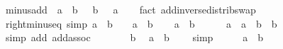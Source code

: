 \begin{isabellebody}
\endisatagproof
{\isafoldproof}%
%
\isadelimproof
\isanewline
%
\endisadelimproof
\isanewline
{}\isamarkupfalse%
\ minus{\isacharunderscore}{\kern0pt}add{\isacharcolon}{\kern0pt}\ {\isachardoublequoteopen}{\isacharminus}{\kern0pt}\ {\isacharparenleft}{\kern0pt}a\ {\isacharplus}{\kern0pt}\ b{\isacharparenright}{\kern0pt}\ {\isacharequal}{\kern0pt}\ {\isacharminus}{\kern0pt}\ b\ {\isacharplus}{\kern0pt}\ {\isacharminus}{\kern0pt}\ a{\isachardoublequoteclose}\isanewline
%
\isadelimproof
\ \ %
\endisadelimproof
%
\isatagproof
{}\isamarkupfalse%
\ {\isacharparenleft}{\kern0pt}fact\ add{\isachardot}{\kern0pt}inverse{\isacharunderscore}{\kern0pt}distrib{\isacharunderscore}{\kern0pt}swap{\isacharparenright}{\kern0pt}%
\endisatagproof
{\isafoldproof}%
%
\isadelimproof
\isanewline
%
\endisadelimproof
\isanewline
{}\isamarkupfalse%
\ right{\isacharunderscore}{\kern0pt}minus{\isacharunderscore}{\kern0pt}eq\ {\isacharbrackleft}{\kern0pt}simp{\isacharbrackright}{\kern0pt}{\isacharcolon}{\kern0pt}\ {\isachardoublequoteopen}a\ {\isacharminus}{\kern0pt}\ b\ {\isacharequal}{\kern0pt}\ {}\ {\isasymlongleftrightarrow}\ a\ {\isacharequal}{\kern0pt}\ b{\isachardoublequoteclose}\isanewline
%
\isadelimproof
%
\endisadelimproof
%
\isatagproof
{}\isamarkupfalse%
\isanewline
\ \ \isamarkupfalse%
\ {\isachardoublequoteopen}a\ {\isacharminus}{\kern0pt}\ b\ {\isacharequal}{\kern0pt}\ {}{\isachardoublequoteclose}\isanewline
\ \ \isamarkupfalse%
\ {\isachardoublequoteopen}a\ {\isacharequal}{\kern0pt}\ {\isacharparenleft}{\kern0pt}a\ {\isacharminus}{\kern0pt}\ b{\isacharparenright}{\kern0pt}\ {\isacharplus}{\kern0pt}\ b{\isachardoublequoteclose}\ \isamarkupfalse%
\ {\isacharparenleft}{\kern0pt}simp\ add{\isacharcolon}{\kern0pt}\ add{\isachardot}{\kern0pt}assoc{\isacharparenright}{\kern0pt}\isanewline
\ \ \isamarkupfalse%
\ \isamarkupfalse%
\ {\isachardoublequoteopen}{\isasymdots}\ {\isacharequal}{\kern0pt}\ b{\isachardoublequoteclose}\ \isamarkupfalse%
\ {\isacartoucheopen}a\ {\isacharminus}{\kern0pt}\ b\ {\isacharequal}{\kern0pt}\ {}{\isacartoucheclose}\ \isamarkupfalse%
\ simp\isanewline
\ \ \isamarkupfalse%
\ \isamarkupfalse%
\ {\isachardoublequoteopen}a\ {\isacharequal}{\kern0pt}\ b{\isachardoublequoteclose}\ \isacommand{{\isachardot}{\kern0pt}}\isamarkupfalse%
\isanewline
{}\isamarkupfalse%
\isanewline
\ \ \isamarkupfalse%

\end{isabellebody}
